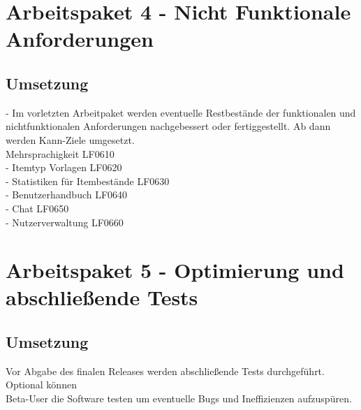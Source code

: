 \documentclass[11pt,a4paper]{report}
\begin{document}
\section{Arbeitspaket 4 - Nicht Funktionale Anforderungen }
\subsection{Umsetzung}
- Im vorletzten Arbeitpaket werden eventuelle Restbestände der funktionalen und\\ nichtfunktionalen Anforderungen nachgebessert oder fertiggestellt. Ab dann werden Kann-Ziele umgesetzt.\\
 Mehrsprachigkeit LF0610\\
- Itemtyp Vorlagen LF0620\\
- Statistiken für Itembestände LF0630\\
- Benutzerhandbuch LF0640\\
- Chat LF0650\\
- Nutzerverwaltung LF0660\\
\section{Arbeitspaket 5 - Optimierung und abschließende Tests}
\subsection{Umsetzung}
Vor Abgabe des finalen Releases werden abschließende Tests durchgeführt. Optional können\\ Beta-User die Software testen um eventuelle Bugs und Ineffizienzen aufzuspüren. \\
\end{document}
